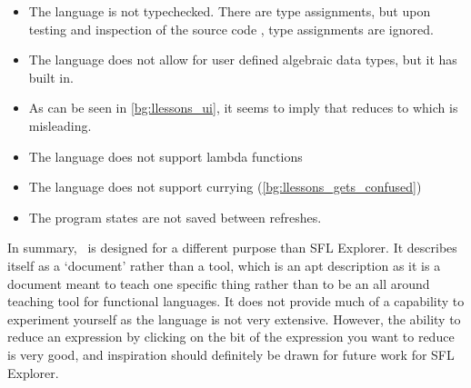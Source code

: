 \begin{itemize}
    \item The language is not typechecked. There are type assignments, but upon testing and inspection of the source code \cite{lambdalessonsgithub}, type assignments are ignored. 
    \item The language does not allow for user defined algebraic data types, but it has  built in. 
    \item As can be seen in \ref{bg:llessons_ui}, it seems to imply that  reduces to \sflinline{[x, y]} which is misleading. 
    \item The language does not support lambda functions
    \item The language does not support currying (\ref{bg:llessons_gets_confused})
    \item The program states are not saved between refreshes.
\end{itemize} 

In summary, \llessons\ is designed for a different purpose than SFL Explorer. It describes itself as a `document' \cite{lambdalessons} rather than a tool, which is an apt description as it is a document meant to teach one specific thing rather than to be an all around teaching tool for functional languages. It does not provide much of a capability to experiment yourself as the language is not very extensive. However, the ability to reduce an expression by clicking on the bit of the expression you want to reduce is very good, and inspiration should definitely be drawn for future work for SFL Explorer.  





